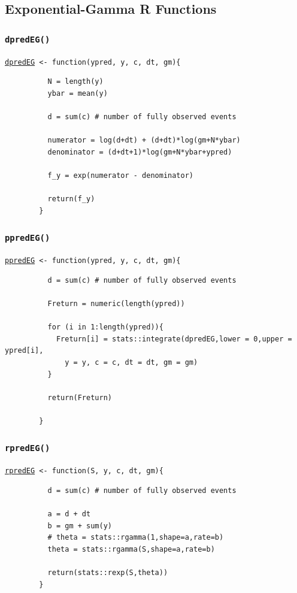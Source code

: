\documentclass[12pt, a4paper]{article}
\begin{document}
  \subsection{Exponential-Gamma R Functions}
    \subsubsection{\texttt{dpredEG()}}\label{sec:dpredEG}

    \texttt{\hyperref[sec:EGimp]{dpredEG} <- function(ypred, y, c, dt, gm)\{ }

      \begin{verbatim}
          N = length(y)
          ybar = mean(y)

          d = sum(c) # number of fully observed events

          numerator = log(d+dt) + (d+dt)*log(gm+N*ybar)
          denominator = (d+dt+1)*log(gm+N*ybar+ypred)

          f_y = exp(numerator - denominator)

          return(f_y)
        }
      \end{verbatim}

    \subsubsection{\texttt{ppredEG()}}\label{sec:ppredEG}

    \texttt{\hyperref[sec:EGimp]{ppredEG} <- function(ypred, y, c, dt, gm)\{ }

      \begin{verbatim}
          d = sum(c) # number of fully observed events

          Freturn = numeric(length(ypred))

          for (i in 1:length(ypred)){
            Freturn[i] = stats::integrate(dpredEG,lower = 0,upper = ypred[i],
              y = y, c = c, dt = dt, gm = gm)
          }

          return(Freturn)

        }
      \end{verbatim}

    \subsubsection{\texttt{rpredEG()}}\label{sec:rpredEG}

    \texttt{\hyperref[sec:EGimp]{rpredEG} <- function(S, y, c, dt, gm)\{ }

      \begin{verbatim}
          d = sum(c) # number of fully observed events

          a = d + dt
          b = gm + sum(y)
          # theta = stats::rgamma(1,shape=a,rate=b)
          theta = stats::rgamma(S,shape=a,rate=b)

          return(stats::rexp(S,theta))
        }
      \end{verbatim}
\end{document}

